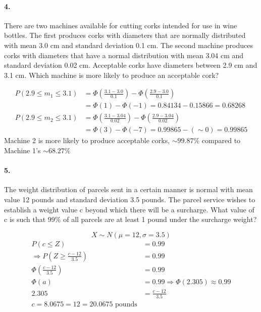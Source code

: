     \paragraph*{4.}
    There are two machines available for cutting corks intended for use in wine bottles. The first produces corks with diameters that are normally distributed with mean 3.0 cm and standard deviation 0.1 cm. The second machine produces corks with diameters that have a normal distribution with mean 3.04 cm and standard deviation 0.02 cm. Acceptable corks have diameters between 2.9 cm and 3.1 cm. Which machine is more likely to produce an acceptable cork?
    \\
    \begin{mdframed}
        \begin{align*}
            P(2.9 \leq m_{1} \leq 3.1)  & = \Phi\left(\frac{3.1-3.0}{0.1}\right) - \Phi\left(\frac{2.9-3.0}{0.1}\right) \\
                                        & = \Phi(1) - \Phi(-1) = 0.84134 - 0.15866 = 0.68268 \\
            P(2.9 \leq m_{2} \leq 3.1)  & = \Phi\left(\frac{3.1-3.04}{0.02}\right) - \Phi\left(\frac{2.9-3.04}{0.02}\right) \\
                                        & = \Phi(3) - \Phi(-7) = 0.99865 - (\sim 0) = 0.99865
        \end{align*}
        Machine 2 is more likely to produce acceptable corks, $\sim 99.87\%$ compared to Machine 1's $\sim 68.27\%$
    \end{mdframed}

    \pagebreak

    \paragraph*{5.}
    The weight distribution of parcels sent in a certain manner is normal with mean value 12 pounds and standard deviation 3.5 pounds. The parcel service wishes to establish a weight value c beyond which there will be a surcharge. What value of c is such that 99\% of all parcels are at least 1 pound under the surcharge weight?
    \\
    \begin{mdframed}
        \begin{equation*}
            X \sim N(\mu=12,\sigma=3.5)
        \end{equation*}
        \begin{align*}
        P(c \leq Z)                                             & = 0.99        \\
            \Rightarrow P\left(Z \geq \frac{c-12}{3.5}\right)   & = 0.99        \\
            \Phi\left(\frac{c-12}{3.5}\right)                   & = 0.99        \\
            \Phi(a) & = 0.99 \Rightarrow \Phi(2.305) \approx 0.99               \\
            2.305   & = \frac{c-12}{3.5}    \\
            c = 8.0675 = 12 = \boxed{20.0675 \text{ pounds}}
        \end{align*}
    \end{mdframed}

